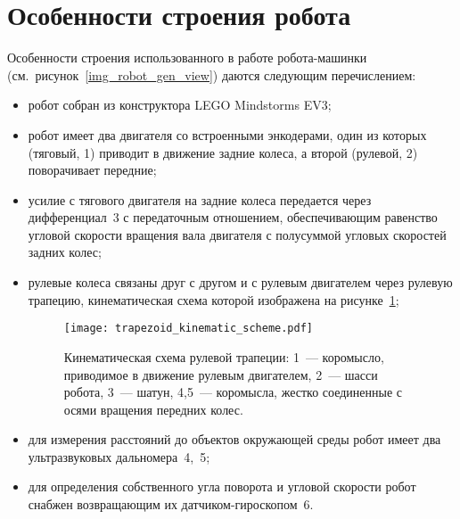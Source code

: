 \newpage
\section{Особенности строения робота}\label{part_robot_features}
Особенности строения использованного в работе робота-машинки (см.~рисунок~\ref{img_robot_gen_view}) даются следующим перечислением:
\begin{itemize}
    \item робот собран из конструктора LEGO Mindstorms EV3;
    \item робот имеет два двигателя со встроенными энкодерами, один из которых (тяговый, 1) приводит в движение задние колеса, а второй (рулевой, 2) поворачивает передние;
    \item усилие с тягового двигателя на задние колеса передается через дифференциал~3 с передаточным отношением, обеспечивающим равенство угловой скорости вращения вала двигателя с полусуммой угловых скоростей задних колес;
    \item рулевые колеса связаны друг с другом и с рулевым двигателем через рулевую трапецию, кинематическая схема которой изображена на рисунке~\ref{img_trapezoid_scheme};
    \begin{figure}[h]
        \centering
        \texttt{[image: trapezoid\_kinematic\_scheme.pdf]}
        \caption{Кинематическая схема рулевой трапеции: 1~--- коромысло, приводимое в движение рулевым двигателем, 2~--- шасси робота, 3~--- шатун, 4,5~--- коромысла, жестко соединенные с осями вращения передних колес.}
        \label{img_trapezoid_scheme}
    \end{figure}
    \item для измерения расстояний до объектов окружающей среды робот имеет два ультразвуковых дальномера~4,~5;
    \item для определения собственного угла поворота и угловой скорости робот снабжен возвращающим их датчиком-гироскопом~6.
\end{itemize}

